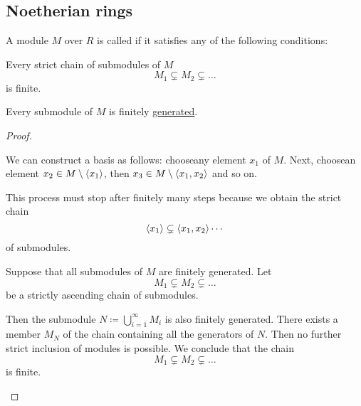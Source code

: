 \subsection{Noetherian rings}\label{subsec:noetherian_rings}

\begin{definition}\label{def:noetherian_module}\cite[proposition 8.30]{Knapp2016BAlg}
  A module \( M \) over \( R \) is called  if it satisfies any of the following conditions:
  \begin{defenum}
     Every strict chain of submodules of \( M \)
    \begin{equation*}
      M_1 \subsetneq M_2 \subsetneq \ldots
    \end{equation*}
    is finite.

     Every submodule of \( M \) is finitely \hyperref[def:free_left_module]{generated}.
  \end{defenum}
\end{definition}
\begin{proof}\mbox{}
  \begin{description}
     We can construct a basis as follows: choose\AOC any element \( x_1 \) of \( M \). Next, choose\AOC an element \( x_2 \in M \setminus \left\langle x_1 \right\rangle \), then \( x_3 \in M \setminus \left\langle x_1, x_2 \right\rangle \) and so on.

    This process must stop after finitely many steps because we obtain the strict chain
    \begin{equation*}
      \left\langle x_1 \right\rangle \subsetneq \left\langle x_1, x_2 \right\rangle \cdots
    \end{equation*}
    of submodules.

     Suppose that all submodules of \( M \) are finitely generated. Let
    \begin{equation*}
      M_1 \subsetneq M_2 \subsetneq \ldots
    \end{equation*}
    be a strictly ascending chain of submodules.

    Then the submodule \( N \coloneqq \bigcup_{i=1}^\infty M_i \) is also finitely generated. There exists a member \( M_N \) of the chain containing all the generators of \( N \). Then no further strict inclusion of modules is possible. We conclude that the chain
    \begin{equation*}
      M_1 \subsetneq M_2 \subsetneq \ldots
    \end{equation*}
    is finite.
  \end{description}
\end{proof}

